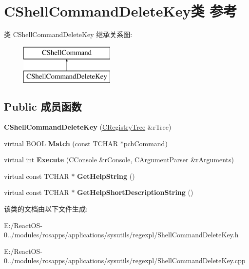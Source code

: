 \hypertarget{class_c_shell_command_delete_key}{}\section{C\+Shell\+Command\+Delete\+Key类 参考}
\label{class_c_shell_command_delete_key}
类 C\+Shell\+Command\+Delete\+Key 继承关系图\+:\begin{figure}[H]
\begin{center}
\leavevmode
\includegraphics[height=2.000000cm]{class_c_shell_command_delete_key}
\end{center}
\end{figure}
\subsection*{Public 成员函数}
\begin{DoxyCompactItemize}
\item 
\mbox{\label{class_c_shell_command_delete_key_a02513689bb3b6a9ea12fe58cc8fd4e16}} 
{\bfseries C\+Shell\+Command\+Delete\+Key} (\hyperlink{class_c_registry_tree}{C\+Registry\+Tree} \&r\+Tree)
\item 
\mbox{\label{class_c_shell_command_delete_key_a442cef99784272d071aefbbe5ae56f65}} 
virtual B\+O\+OL {\bfseries Match} (const T\+C\+H\+AR $\ast$pch\+Command)
\item 
\mbox{\label{class_c_shell_command_delete_key_aaaf99cac15e4f8d32fd18a2da1d85e36}} 
virtual int {\bfseries Execute} (\hyperlink{class_c_console}{C\+Console} \&r\+Console, \hyperlink{class_c_argument_parser}{C\+Argument\+Parser} \&r\+Arguments)
\item 
\mbox{\label{class_c_shell_command_delete_key_ab0d3b5fb4cb80c3cbd27fd3d12d74aae}} 
virtual const T\+C\+H\+AR $\ast$ {\bfseries Get\+Help\+String} ()
\item 
\mbox{\label{class_c_shell_command_delete_key_adccc58decf14f19d71d03d6f0a2c0425}} 
virtual const T\+C\+H\+AR $\ast$ {\bfseries Get\+Help\+Short\+Description\+String} ()
\end{DoxyCompactItemize}


该类的文档由以下文件生成\+:\begin{DoxyCompactItemize}
\item 
E\+:/\+React\+O\+S-\/0../modules/rosapps/applications/sysutils/regexpl/Shell\+Command\+Delete\+Key.\+h\item 
E\+:/\+React\+O\+S-\/0../modules/rosapps/applications/sysutils/regexpl/Shell\+Command\+Delete\+Key.\+cpp\end{DoxyCompactItemize}
